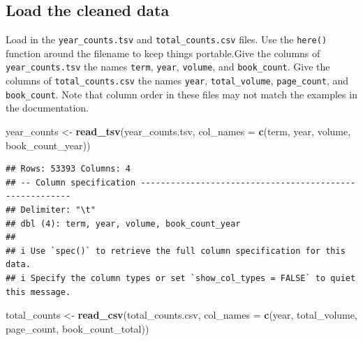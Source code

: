 \documentclass[
]{article}
\newenvironment{Shaded}{\begin{snugshade}}{\end{snugshade}}
\newcommand{\AttributeTok}[1]{\textcolor[rgb]{0.13,0.29,0.53}{#1}}
\newcommand{\FunctionTok}[1]{\textcolor[rgb]{0.13,0.29,0.53}{\textbf{#1}}}
\newcommand{\NormalTok}[1]{#1}
\newcommand{\OtherTok}[1]{\textcolor[rgb]{0.56,0.35,0.01}{#1}}
\newcommand{\StringTok}[1]{\textcolor[rgb]{0.31,0.60,0.02}{#1}}
\begin{document}
\hypertarget{load-the-cleaned-data}{%
\subsection{Load the cleaned data}\label{load-the-cleaned-data}}

Load in the \texttt{year\_counts.tsv} and \texttt{total\_counts.csv}
files. Use the \texttt{here()} function around the filename to keep
things portable.Give the columns of \texttt{year\_counts.tsv} the names
\texttt{term}, \texttt{year}, \texttt{volume}, and \texttt{book\_count}.
Give the columns of \texttt{total\_counts.csv} the names \texttt{year},
\texttt{total\_volume}, \texttt{page\_count}, and \texttt{book\_count}.
Note that column order in these files may not match the examples in the
documentation.

\begin{Shaded}
\begin{Highlighting}[]
\NormalTok{year\_counts }\OtherTok{\textless{}{-}} \FunctionTok{read\_tsv}\NormalTok{(}\StringTok{\textquotesingle{}year\_counts.tsv\textquotesingle{}}\NormalTok{, }
                   \AttributeTok{col\_names =} \FunctionTok{c}\NormalTok{(}\StringTok{\textquotesingle{}term\textquotesingle{}}\NormalTok{, }\StringTok{\textquotesingle{}year\textquotesingle{}}\NormalTok{, }\StringTok{\textquotesingle{}volume\textquotesingle{}}\NormalTok{, }\StringTok{\textquotesingle{}book\_count\_year\textquotesingle{}}\NormalTok{))}
\end{Highlighting}
\end{Shaded}

\begin{verbatim}
## Rows: 53393 Columns: 4
## -- Column specification --------------------------------------------------------
## Delimiter: "\t"
## dbl (4): term, year, volume, book_count_year
## 
## i Use `spec()` to retrieve the full column specification for this data.
## i Specify the column types or set `show_col_types = FALSE` to quiet this message.
\end{verbatim}

\begin{Shaded}
\begin{Highlighting}[]
\NormalTok{total\_counts }\OtherTok{\textless{}{-}} \FunctionTok{read\_csv}\NormalTok{(}\StringTok{\textquotesingle{}total\_counts.csv\textquotesingle{}}\NormalTok{, }
                   \AttributeTok{col\_names =} \FunctionTok{c}\NormalTok{(}\StringTok{\textquotesingle{}year\textquotesingle{}}\NormalTok{, }\StringTok{\textquotesingle{}total\_volume\textquotesingle{}}\NormalTok{, }\StringTok{\textquotesingle{}page\_count\textquotesingle{}}\NormalTok{, }\StringTok{\textquotesingle{}book\_count\_total\textquotesingle{}}\NormalTok{))}
\end{Highlighting}
\end{Shaded}
\end{document}
